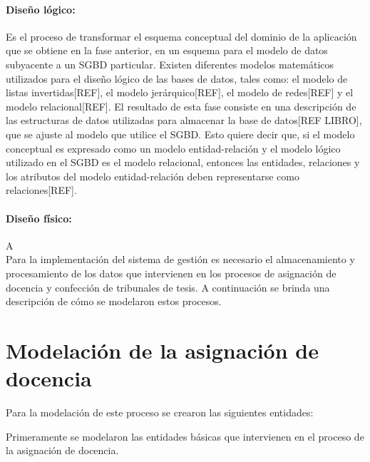 \paragraph{Diseño lógico:}
Es el proceso de transformar el esquema conceptual del dominio de la aplicación
que se obtiene en la fase anterior,
en un esquema para el modelo de datos subyacente a un SGBD particular.
Existen diferentes modelos matemáticos utilizados para el diseño lógico
de las bases de datos, tales como: el modelo de listas invertidas[REF], el modelo 
jerárquico[REF], el modelo de redes[REF] y el modelo relacional[REF]. 
El resultado de esta fase consiste en una descripción de las estructuras 
de datos utilizadas para almacenar la base de datos[REF LIBRO], que se 
ajuste al modelo que utilice el SGBD. Esto quiere decir que,
si el modelo conceptual es expresado como un modelo 
entidad-relación y el modelo lógico utilizado en el SGBD es el modelo 
relacional, entonces las entidades, relaciones y los atributos del modelo entidad-relación
deben representarse como relaciones[REF]. 



\paragraph{Diseño físico:} A \\

Para la implementación del sistema de gestión es necesario el almacenamiento
y procesamiento de los datos que intervienen en los procesos de asignación de 
docencia y confección de tribunales de tesis. A continuación se brinda una 
descripción de cómo se modelaron estos procesos.


\section{Modelación de la asignación de docencia}
Para la modelación de este proceso se crearon las 
siguientes entidades:

Primeramente se modelaron las entidades básicas que intervienen 
en el proceso de la asignación de docencia. 




